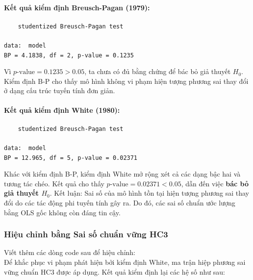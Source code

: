 \documentclass[12pt, a4paper]{article}
\begin{document}
	\paragraph{Kết quả kiểm định Breusch-Pagan (1979):}
	\begin{verbatim}
	studentized Breusch-Pagan test

data:  model
BP = 4.1838, df = 2, p-value = 0.1235
	\end{verbatim}
	Vì $p\text{-value} = 0.1235 > 0.05$, ta chưa có đủ bằng chứng để bác bỏ giả thuyết $H_0$. Kiểm định B-P cho thấy mô hình không vi phạm hiện tượng phương sai thay đổi ở dạng cấu trúc tuyến tính đơn giản.
	
	\paragraph{Kết quả kiểm định White (1980):}
	\begin{verbatim}
	studentized Breusch-Pagan test

data:  model
BP = 12.965, df = 5, p-value = 0.02371
	\end{verbatim}
	Khác với kiểm định B-P, kiểm định White mở rộng xét cả các dạng bậc hai và tương tác chéo. Kết quả cho thấy $p\text{-value} = 0.02371 < 0.05$, dẫn đến việc \textbf{bác bỏ giả thuyết $H_0$}. Kết luận: Sai số của mô hình tồn tại hiện tượng phương sai thay đổi do các tác động phi tuyến tính gây ra. Do đó, các sai số chuẩn ước lượng bằng OLS gốc không còn đáng tin cậy.

	\subsubsection{Hiệu chỉnh bằng Sai số chuẩn vững HC3}
    Viết thêm các dòng code sau để hiệu chỉnh:\\
    \noindent{}
	Để khắc phục vi phạm phát hiện bởi kiểm định White, ma trận hiệp phương sai vững chuẩn HC3 được áp dụng. Kết quả kiểm định lại các hệ số như sau:
	
\end{document}
